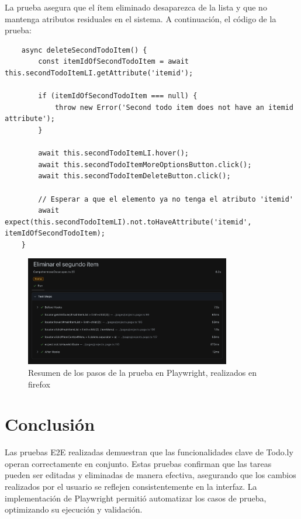 \documentclass{report}
\begin{document}
La prueba asegura que el ítem eliminado desaparezca de la lista y que no mantenga atributos residuales en el sistema. A continuación, el código de la prueba:

\begin{lstlisting}
    async deleteSecondTodoItem() {
        const itemIdOfSecondTodoItem = await this.secondTodoItemLI.getAttribute('itemid');
    
        if (itemIdOfSecondTodoItem === null) {
            throw new Error('Second todo item does not have an itemid attribute');
        }
    
        await this.secondTodoItemLI.hover();
        await this.secondTodoItemMoreOptionsButton.click();
        await this.secondTodoItemDeleteButton.click();
    
        // Esperar a que el elemento ya no tenga el atributo 'itemid'
        await expect(this.secondTodoItemLI).not.toHaveAttribute('itemid', itemIdOfSecondTodoItem);
    }
\end{lstlisting}
\begin{figure}[h!]
    \centering
    \includegraphics[width=0.8\textwidth]{./imgs/playwright/Captura de pantalla 2024-11-17 a la(s) 21.50.05.png}
    \caption{Resumen de los pasos de la prueba en Playwright, realizados en firefox}
    \label{fig:tc1playwright}
\end{figure}
\section{Conclusión}

Las pruebas E2E realizadas demuestran que las funcionalidades clave de Todo.ly operan correctamente en conjunto. Estas pruebas confirman que las tareas pueden ser editadas y eliminadas de manera efectiva, asegurando que los cambios realizados por el usuario se reflejen consistentemente en la interfaz. La implementación de Playwright permitió automatizar los casos de prueba, optimizando su ejecución y validación.
\end{document}
